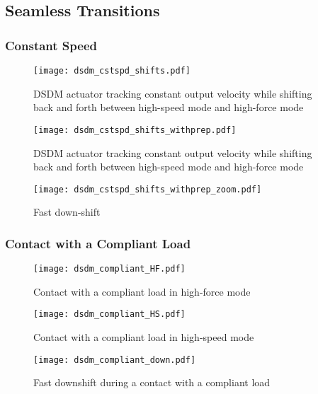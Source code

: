 \subsection{Seamless Transitions}

\subsubsection{Constant Speed}

\begin{figure}[H]
	\centering
		\texttt{[image: dsdm\_cstspd\_shifts.pdf]}
	\caption{DSDM actuator tracking constant output velocity while shifting back and forth between high-speed mode and high-force mode }
	\label{fig:dsdm_cstspd_shifts}
\end{figure}


\begin{figure}[H]
	\centering
		\texttt{[image: dsdm\_cstspd\_shifts\_withprep.pdf]}
	\caption{DSDM actuator tracking constant output velocity while shifting back and forth between high-speed mode and high-force mode }
	\label{fig:dsdm_cstspd_shifts_withprep}
\end{figure}

\begin{figure}[H]
	\centering
		\texttt{[image: dsdm\_cstspd\_shifts\_withprep\_zoom.pdf]}
	\caption{ Fast down-shift }
	\label{fig:dsdm_cstspd_shifts_withprep_zoom}
\end{figure}

\subsubsection{Contact with a Compliant Load}

\begin{figure}[H]
	\centering
		\texttt{[image: dsdm\_compliant\_HF.pdf]}
	\caption{ Contact with a compliant load in high-force mode }
	\label{fig:dsdm_compliant_HF}
\end{figure}

\begin{figure}[H]
	\centering
		\texttt{[image: dsdm\_compliant\_HS.pdf]}
	\caption{ Contact with a compliant load in high-speed mode }
	\label{fig:dsdm_compliant_HS}
\end{figure}

\begin{figure}[H]
	\centering
		\texttt{[image: dsdm\_compliant\_down.pdf]}
	\caption{ Fast downshift during a contact with a compliant load }
	\label{fig:dsdm_compliant_down}
\end{figure}



